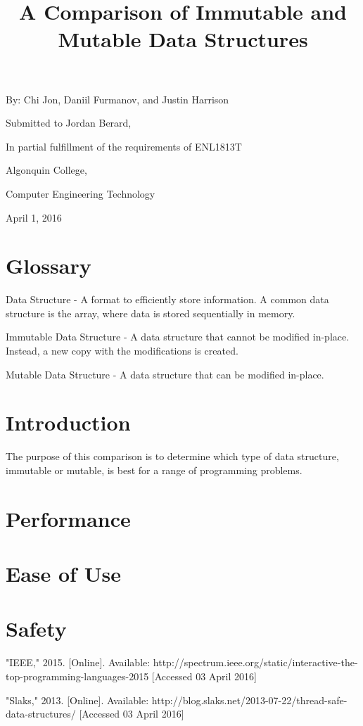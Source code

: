 \documentclass{article}
\title{A Comparison of Immutable and Mutable Data Structures}
\author{}
\date{}
\newcommand{\glossaryentry}[2]{#1 - #2}
\begin{document}
\maketitle

\begin{center}
By:  Chi Jon, Daniil Furmanov, and Justin Harrison

\hfill

Submitted to Jordan Berard,

In partial fulfillment of the requirements of ENL1813T

\hfill

Algonquin College,

Computer Engineering Technology

\hfill

April 1, 2016
\end{center}

\section{Glossary}
\glossaryentry{Data Structure}{
  A format to efficiently store information. A common data
  structure is the array, where data is stored sequentially in memory.
}

\glossaryentry{Immutable Data Structure}{
  A data structure that cannot be modified in-place.
  Instead, a new copy with the modifications is created.
}

\glossaryentry{Mutable Data Structure}{
  A data structure that can be modified in-place.
}

\section{Introduction}
The purpose of this comparison is to determine which type of data structure,
immutable or mutable, is best for a range of programming problems.

\section{Performance}

\section{Ease of Use}

\section{Safety}

\begin{thebibliography}{9}

  "IEEE,"
  2015.
  [Online].
  Available: http://spectrum.ieee.org/static/interactive-the-top-programming-languages-2015
  [Accessed 03 April 2016]

  "Slaks,"
  2013.
  [Online].
  Available: http://blog.slaks.net/2013-07-22/thread-safe-data-structures/
  [Accessed 03 April 2016]

\end{thebibliography}
\end{document}
